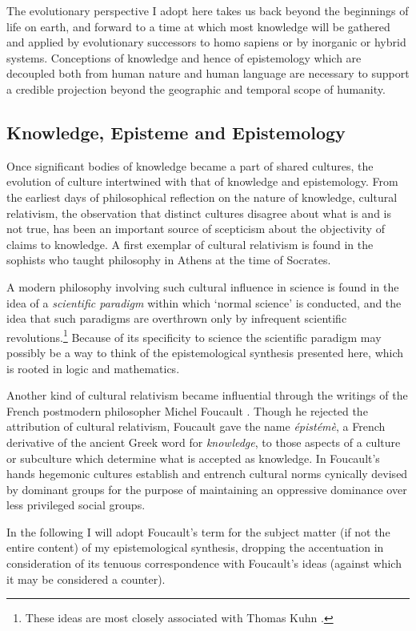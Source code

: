 \documentclass[10pt,titlepage]{book}
\begin{document}
The evolutionary perspective I adopt here takes us back beyond the beginnings of life on earth, and forward to a time at which most knowledge will be gathered and applied by evolutionary successors to homo sapiens or by inorganic or hybrid systems.
Conceptions of knowledge and hence of epistemology which are decoupled both from human nature and human language are necessary to support a credible projection beyond the geographic and temporal scope of humanity.

\subsection{Knowledge, Episteme and Epistemology}

Once significant bodies of knowledge became a part of shared cultures, the evolution of culture intertwined with that of knowledge and epistemology.
From the earliest days of philosophical reflection on the nature of knowledge, cultural relativism, the observation that distinct cultures disagree about what is and is not true, has been an important source of scepticism about the objectivity of claims to knowledge.
A first exemplar of cultural relativism is found in the sophists who taught philosophy in Athens at the time of Socrates.

A modern philosophy involving such cultural influence in science is found in the idea of a \emph{scientific paradigm} within which `normal science' is conducted, and the idea that such paradigms are overthrown only by infrequent scientific revolutions.\footnote{These ideas are most closely associated with Thomas Kuhn \cite{kuhn2012structure,kuhn2000structure}.}
Because of its specificity to science the scientific paradigm may possibly be a way to think of the epistemological synthesis presented here, which is rooted in logic and mathematics.

Another kind of cultural relativism became influential through the writings of the French postmodern philosopher Michel Foucault \cite{foucault1966order}.
Though he rejected the attribution of cultural relativism, Foucault gave the name \emph{épistémè}, a French derivative of the ancient Greek word for \emph{knowledge}, to those aspects of a culture or subculture which determine what is accepted as knowledge.
In Foucault's hands hegemonic cultures establish and entrench cultural norms cynically devised by dominant groups for the purpose of maintaining an oppressive dominance over less privileged social groups.

In the following I will adopt Foucault's term for the subject matter (if not the entire content) of my epistemological synthesis, dropping the accentuation in consideration of its tenuous correspondence with Foucault's ideas (against which it may be considered a counter).
\end{document}
